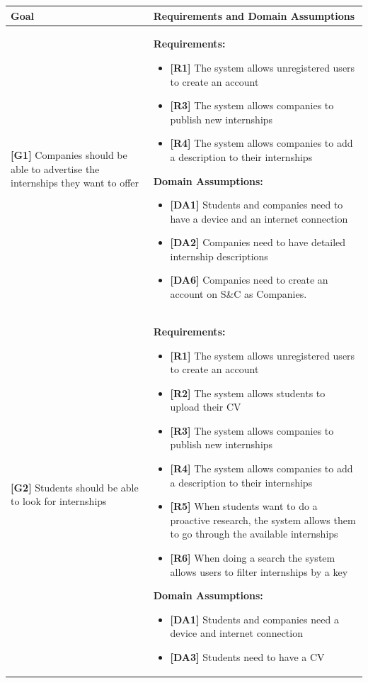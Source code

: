 \begin{longtable}{|p{}|p{}|}
\hline
\textbf{Goal} & \textbf{Requirements and Domain Assumptions} \\
\hline
\textbf{[G1]} Companies should be able to advertise the internships they want to offer 
& 
\textbf{Requirements:}
\begin{itemize}
     \item \textbf{[R1]} The system allows unregistered users to create an account
    \item \textbf{[R3]} The system allows companies to publish new internships
    \item \textbf{[R4]} The system allows companies to add a description to their internships
\end{itemize}
\textbf{Domain Assumptions:}
\begin{itemize}
    \item \textbf{[DA1]} Students and companies need to have a device and an internet connection
    \item \textbf{[DA2]} Companies need to have detailed internship descriptions
    \item \textbf{[DA6]} Companies need to create an account on S\&C as Companies.
\end{itemize} \\
\hline
\textbf{[G2]} Students should be able to look for internships 
& 
\textbf{Requirements:}
\begin{itemize}
     \item \textbf{[R1]} The system allows unregistered users to create an account
    \item \textbf{[R2]} The system allows students to upload their CV
    \item \textbf{[R3]} The system allows companies to publish new internships
    \item \textbf{[R4]} The system allows companies to add a description to their internships
    \item \textbf{[R5]} When students want to do a proactive research, the system allows them to go through the available internships
    \item \textbf{[R6]} When doing a search the system allows users to filter internships by a key
\end{itemize}
\textbf{Domain Assumptions:}
\begin{itemize}
    \item \textbf{[DA1]} Students and companies need a device and internet connection
    \item \textbf{[DA3]} Students need to have a CV

\end{itemize}
\end{longtable}
